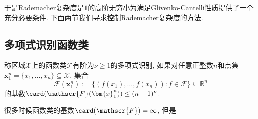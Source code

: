 于是Rademacher复杂度是$1$的高阶无穷小为满足Glivenko-Cantelli性质提供了一个充分必要条件. 
下面两节我们寻求控制Rademacher复杂度的方法. 

\subsection{多项式识别函数类}

\begin{definition}[多项式识别]
	称区域$\mathcal{X}$上的函数类$\mathscr{F}$有阶为$\nu \geq 1$的多项式识别, 如果对任意正整数$n$和点集$\bm{x}_1^n = \{x_1, \dots, x_n\} \subseteq \mathcal{X}$, 集合
	\begin{equation*}
		\mathscr{F}(\bm{x}_1^n) 
		:= \{(f(x_1), \dots, f(x_n)) \colon f \in \mathscr{F}\}
		\subseteq \mathbb{R}^n
	\end{equation*}
	的基数$\card(\mathscr{F}(\bm{x}_1^n)) \leq (n+1)^{\nu}$. 
\end{definition}

很多时候函数类的基数$\card(\mathscr{F}) = \infty$, 但是

